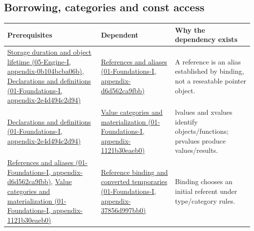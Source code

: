 \subsection{Borrowing, categories and const access}\label{appendix-4ad47bdd269a-borrowing-categories-and-const-access}

{\def\LTcaptype{none} %
\begin{longtable}[]{@{}
  >{\raggedright\arraybackslash}p{}
  >{\raggedright\arraybackslash}p{}
  >{\raggedright\arraybackslash}p{}@{}}
\toprule\noalign{}
\begin{minipage}[b]{\linewidth}\raggedright
Prerequisites
\end{minipage} & \begin{minipage}[b]{\linewidth}\raggedright
Dependent
\end{minipage} & \begin{minipage}[b]{\linewidth}\raggedright
Why the dependency exists
\end{minipage} \\
\midrule\noalign{}
\endhead
\bottomrule\noalign{}
\endlastfoot
\href{../05-Engine-I/main.pdf\#nameddest=appendix-0b104bcba06b}{Storage duration and object lifetime (05-Engine-I, appendix-0b104bcba06b)}, \href{../01-Foundations-I/main.pdf\#nameddest=appendix-2e4d494c2d94}{Declarations and definitions (01-Foundations-I, appendix-2e4d494c2d94)} & \href{../01-Foundations-I/main.pdf\#nameddest=appendix-d6d562ca9fbb}{References and aliases (01-Foundations-I, appendix-d6d562ca9fbb)} & A reference is an alias established by binding, not a reseatable pointer object. \\
\href{../01-Foundations-I/main.pdf\#nameddest=appendix-2e4d494c2d94}{Declarations and definitions (01-Foundations-I, appendix-2e4d494c2d94)} & \href{../01-Foundations-I/main.pdf\#nameddest=appendix-1121b30eaeb0}{Value categories and materialization (01-Foundations-I, appendix-1121b30eaeb0)} & lvalues and xvalues identify objects/functions; prvalues produce values/results. \\
\href{../01-Foundations-I/main.pdf\#nameddest=appendix-d6d562ca9fbb}{References and aliases (01-Foundations-I, appendix-d6d562ca9fbb)}, \href{../01-Foundations-I/main.pdf\#nameddest=appendix-1121b30eaeb0}{Value categories and materialization (01-Foundations-I, appendix-1121b30eaeb0)} & \href{../01-Foundations-I/main.pdf\#nameddest=appendix-37856d997bb0}{Reference binding and converted temporaries (01-Foundations-I, appendix-37856d997bb0)} & Binding chooses an initial referent under type/category rules. \\

\end{longtable}}
